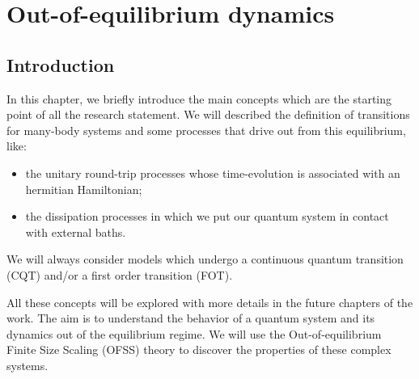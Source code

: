 \chapter{Out-of-equilibrium dynamics}
\label{chp_out}

%
\section{Introduction}


In this chapter, we briefly introduce the main concepts which are the starting point
of all the research statement. We will described the definition of transitions for
many-body systems and some processes that drive out from this equilibrium, like:

\begin{itemize}
	\item
		the unitary round-trip processes whose time-evolution is associated with
		an hermitian Hamiltonian;
	\item
		the dissipation processes in which we put our quantum system in contact with
		external baths.
\end{itemize}

We will always consider models which undergo a continuous quantum transition (CQT)
and/or a first order transition (FOT). 

All these concepts will be explored with more details in the future chapters of the 
work. The aim is to understand the behavior of a quantum system and its dynamics
out of the equilibrium regime. We will use the Out-of-equilibrium
Finite Size Scaling (OFSS) theory to discover the properties of these complex
systems.












